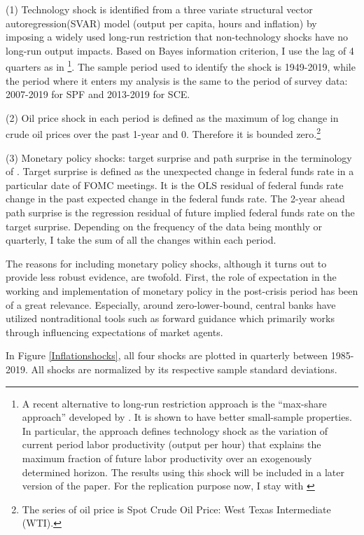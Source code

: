 \documentclass[]{article}
\begin{document}
	
	(1) Technology shock is identified from a three variate structural vector autoregression(SVAR) model  (output per capita, hours and inflation) by imposing a widely used long-run restriction that non-technology shocks have no long-run output impacts. Based on Bayes information criterion, I use the lag of 4 quarters as in \citet{coibion2012can} \footnote{A recent alternative to long-run restriction approach is the ``max-share approach'' developed by \citet{francis2014flexible}. It is shown to have better small-sample properties. In particular,  the approach defines technology shock as the variation of current period labor productivity (output per hour) that explains the maximum fraction of future labor productivity over an exogenously determined horizon. The results using this shock will be included in a later version of the paper. For the replication purpose now, I stay with \citet{gali1999technology}}. The sample period used to identify the shock is 1949-2019, while the period where it enters my analysis is the same to the period of survey data: 2007-2019 for SPF and 2013-2019 for SCE. 
	
	(2) Oil price shock in each period is defined as the maximum of log change in crude oil prices over the past 1-year and 0. Therefore it is bounded zero.\footnote{The series of oil price is Spot Crude Oil Price: West Texas Intermediate (WTI).}
	
	(3) Monetary policy shocks: target surprise and path surprise in the terminology of \citet{laseen2011anticipated}. Target surprise is defined as the unexpected change in federal funds rate in a particular date of FOMC meetings. It is the OLS residual of federal funds rate change in the past expected change in the federal funds rate. The 2-year ahead path surprise is the regression residual of future implied federal funds rate on the target surprise. Depending on the frequency of the data being monthly or quarterly, I take the sum of all the changes within each period.   
	
	The reasons for including monetary policy shocks, although it turns out to provide less robust evidence, are twofold. First, the role of expectation in the working and implementation of monetary policy in the post-crisis period has been of a great relevance. Especially, around zero-lower-bound, central banks have utilized nontraditional tools such as forward guidance which primarily works through influencing expectations of market agents. 
	
	In Figure \ref{Inflationshocks}, all four shocks are plotted in quarterly between 1985-2019. All shocks are normalized by its respective sample standard deviations. 
	
\end{document}
